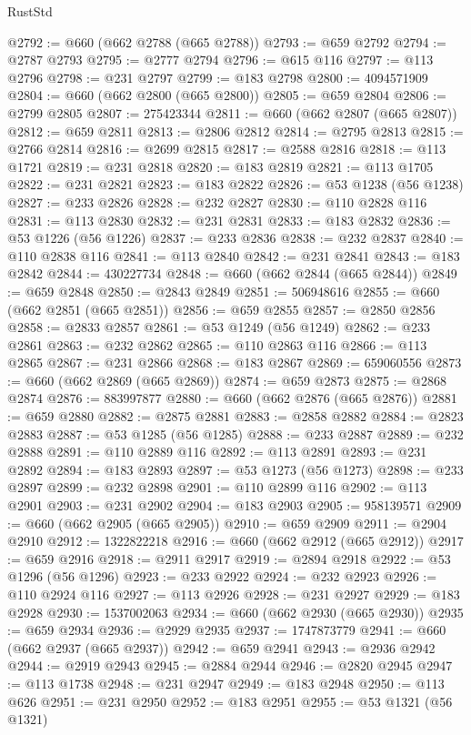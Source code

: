 \begin{lexlean}{RustStd}
\begin{coremodule}
@2792 := @660 (@662 @2788 (@665 @2788))
@2793 := @659 @2792
@2794 := @2787 @2793
@2795 := @2777 @2794
@2796 := @615 @116
@2797 := @113 @2796
@2798 := @231 @2797
@2799 := @183 @2798
@2800 := 4094571909
@2804 := @660 (@662 @2800 (@665 @2800))
@2805 := @659 @2804
@2806 := @2799 @2805
@2807 := 275423344
@2811 := @660 (@662 @2807 (@665 @2807))
@2812 := @659 @2811
@2813 := @2806 @2812
@2814 := @2795 @2813
@2815 := @2766 @2814
@2816 := @2699 @2815
@2817 := @2588 @2816
@2818 := @113 @1721
@2819 := @231 @2818
@2820 := @183 @2819
@2821 := @113 @1705
@2822 := @231 @2821
@2823 := @183 @2822
@2826 := @53 @1238 (@56 @1238)
@2827 := @233 @2826
@2828 := @232 @2827
@2830 := @110 @2828 @116
@2831 := @113 @2830
@2832 := @231 @2831
@2833 := @183 @2832
@2836 := @53 @1226 (@56 @1226)
@2837 := @233 @2836
@2838 := @232 @2837
@2840 := @110 @2838 @116
@2841 := @113 @2840
@2842 := @231 @2841
@2843 := @183 @2842
@2844 := 430227734
@2848 := @660 (@662 @2844 (@665 @2844))
@2849 := @659 @2848
@2850 := @2843 @2849
@2851 := 506948616
@2855 := @660 (@662 @2851 (@665 @2851))
@2856 := @659 @2855
@2857 := @2850 @2856
@2858 := @2833 @2857
@2861 := @53 @1249 (@56 @1249)
@2862 := @233 @2861
@2863 := @232 @2862
@2865 := @110 @2863 @116
@2866 := @113 @2865
@2867 := @231 @2866
@2868 := @183 @2867
@2869 := 659060556
@2873 := @660 (@662 @2869 (@665 @2869))
@2874 := @659 @2873
@2875 := @2868 @2874
@2876 := 883997877
@2880 := @660 (@662 @2876 (@665 @2876))
@2881 := @659 @2880
@2882 := @2875 @2881
@2883 := @2858 @2882
@2884 := @2823 @2883
@2887 := @53 @1285 (@56 @1285)
@2888 := @233 @2887
@2889 := @232 @2888
@2891 := @110 @2889 @116
@2892 := @113 @2891
@2893 := @231 @2892
@2894 := @183 @2893
@2897 := @53 @1273 (@56 @1273)
@2898 := @233 @2897
@2899 := @232 @2898
@2901 := @110 @2899 @116
@2902 := @113 @2901
@2903 := @231 @2902
@2904 := @183 @2903
@2905 := 958139571
@2909 := @660 (@662 @2905 (@665 @2905))
@2910 := @659 @2909
@2911 := @2904 @2910
@2912 := 1322822218
@2916 := @660 (@662 @2912 (@665 @2912))
@2917 := @659 @2916
@2918 := @2911 @2917
@2919 := @2894 @2918
@2922 := @53 @1296 (@56 @1296)
@2923 := @233 @2922
@2924 := @232 @2923
@2926 := @110 @2924 @116
@2927 := @113 @2926
@2928 := @231 @2927
@2929 := @183 @2928
@2930 := 1537002063
@2934 := @660 (@662 @2930 (@665 @2930))
@2935 := @659 @2934
@2936 := @2929 @2935
@2937 := 1747873779
@2941 := @660 (@662 @2937 (@665 @2937))
@2942 := @659 @2941
@2943 := @2936 @2942
@2944 := @2919 @2943
@2945 := @2884 @2944
@2946 := @2820 @2945
@2947 := @113 @1738
@2948 := @231 @2947
@2949 := @183 @2948
@2950 := @113 @626
@2951 := @231 @2950
@2952 := @183 @2951
@2955 := @53 @1321 (@56 @1321)

\end{coremodule}
\end{lexlean}
